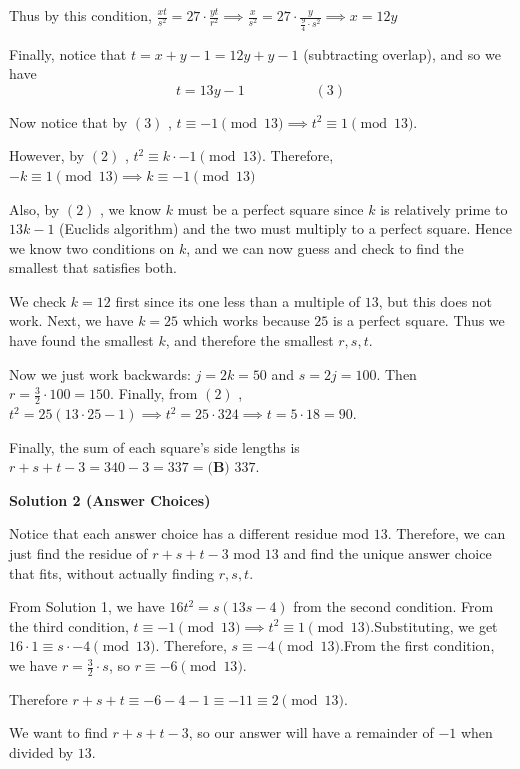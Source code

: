 \begin{enumerate}
 Thus by this condition, $\frac{xt}{s^2} = 27 \cdot \frac{yt}{r^2} \implies \frac{x}{s^2} = 27 \cdot \frac{y}{\frac{9}{4}\cdot s^2} \implies x= 12y$

 Finally, notice that $t=x+y-1=12y+y-1$ (subtracting overlap), and so we have 
 \[t=13y-1 \quad \quad \quad \quad \quad (3)\]

 Now notice that by $(3)$ , $t\equiv -1 \pmod{13}\implies t^2 \equiv 1 \pmod{13}$.

 However, by $(2)$ , $t^2 \equiv k \cdot -1 \pmod{13}$. Therefore, $-k \equiv 1 \pmod{13} \implies k \equiv -1 \pmod{13}$

 Also, by $(2)$ , we know $k$ must be a perfect square since $k$ is relatively prime to $13k-1$ (Euclids algorithm) and the two must multiply to a perfect square. Hence we know two conditions on $k$, and we can now guess and check to find the smallest that satisfies both.

 We check $k=12$ first since its one less than a multiple of $13$, but this does not work. Next, we have $k=25$ which works because $25$ is a perfect square. Thus we have found the smallest $k$, and therefore the smallest $r, s, t$.

 Now we just work backwards: $j= 2k = 50$ and $s=2j=100$. Then $r=\frac{3}{2}\cdot 100 = 150$. Finally, from $(2)$ , $t^2=25(13\cdot25-1) \implies t^2 = 25 \cdot 324 \implies t=5\cdot 18=90$.

 Finally, the sum of each square’s side lengths is $r+s+t-3=340-3=337=\boxed{\textbf{(B) }337}$.

 



\textbf{Solution 2 (Answer Choices)}

Notice that each answer choice has a different residue mod $13$. Therefore, we can just find the residue of $r+s+t-3$ mod $13$ and find the unique answer choice that fits, without actually finding $r, s, t$.

 From Solution 1, we have $16t^2 = s(13s-4)$ from the second condition. From the third condition, $t\equiv -1 \pmod{13} \implies t^2 \equiv 1 \pmod{13}$.Substituting, we get $16 \cdot 1 \equiv s \cdot -4 \pmod{13}$. Therefore, $s \equiv -4 \pmod{13}$.From the first condition, we have $r=\frac{3}{2} \cdot s$, so $r \equiv -6 \pmod{13}$.

 Therefore $r+s+t \equiv -6-4-1 \equiv -11 \equiv 2 \pmod {13}$. 

 We want to find $r+s+t-3$, so our answer will have a remainder of $-1$ when divided by $13$. 


\end{enumerate}
